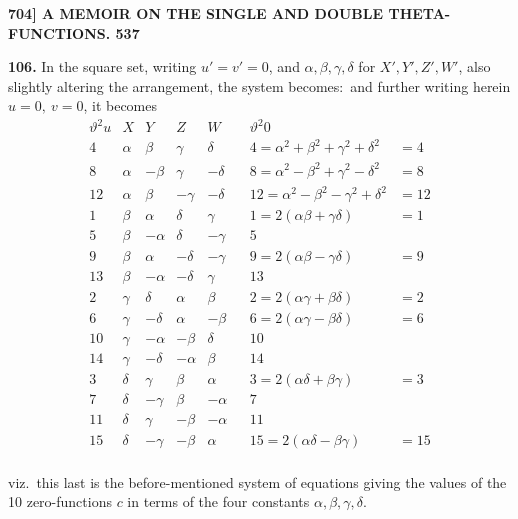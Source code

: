 \documentclass[11pt]{article}
\begin{document}
\newpage
\noindent\textbf{704] \quad A MEMOIR ON THE SINGLE AND DOUBLE THETA-FUNCTIONS. \hfill 537}

\medskip
\textbf{106.} In the square set, writing $u' = v' = 0$, and $\alpha,\beta,\gamma,\delta$ for $X',Y',Z',W'$, also slightly altering the arrangement, the system becomes:\ and further writing herein $u = 0,\ v = 0$, it becomes
\[
\begin{array}{r|cccc|crl}
\vartheta^2 u & X & Y & Z & W & & \vartheta^2 0 & \\\hline
4  & \alpha & \beta & \gamma & \delta & & 4  = \alpha^2 + \beta^2 + \gamma^2 + \delta^2 & = 4\\
8  & \alpha & -\beta & \gamma & -\delta & & 8  = \alpha^2 - \beta^2 + \gamma^2 - \delta^2 & = 8\\
12 & \alpha & \beta & -\gamma & -\delta & & 12 = \alpha^2 - \beta^2 - \gamma^2 + \delta^2 & = 12\\
\hline
1  & \beta & \alpha & \delta & \gamma & & 1  = 2(\alpha\beta + \gamma\delta) & = 1\\
5  & \beta & -\alpha & \delta & -\gamma & & 5 & \\
9  & \beta & \alpha & -\delta & -\gamma & & 9  = 2(\alpha\beta - \gamma\delta) & = 9\\
13 & \beta & -\alpha & -\delta & \gamma & & 13 & \\
\hline
2  & \gamma & \delta & \alpha & \beta & & 2  = 2(\alpha\gamma + \beta\delta) & = 2\\
6  & \gamma & -\delta & \alpha & -\beta & & 6  = 2(\alpha\gamma - \beta\delta) & = 6\\
10 & \gamma & -\alpha & -\beta & \delta & & 10 & \\
14 & \gamma & -\delta & -\alpha & \beta & & 14 & \\
\hline
3  & \delta & \gamma & \beta & \alpha & & 3  = 2(\alpha\delta + \beta\gamma) & = 3\\
7  & \delta & -\gamma & \beta & -\alpha & & 7 & \\
11 & \delta & \gamma & -\beta & -\alpha & & 11 & \\
15 & \delta & -\gamma & -\beta & \alpha & & 15 = 2(\alpha\delta - \beta\gamma) & = 15\\
\end{array}
\]

\smallskip
viz.\ this last is the before-mentioned system of equations giving the values of the 10 zero-functions $c$ in terms of the four constants $\alpha,\beta,\gamma,\delta$.
\end{document}
